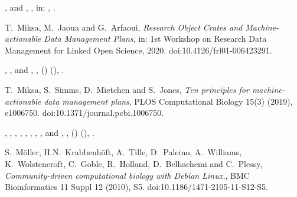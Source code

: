 \documentclass[ds,v1.1.2,openaccess]{iosart2x}%
\begin{document}
\begin{thebibliography}{}
%
\begin{bchapter}
,
 and
,
,
in: ,
.
\end{bchapter}
%
\OrigBibText
T.~Miksa,
M.~Jaoua and
G.~Arfaoui,
\textit{Research Object Crates and Machine-actionable Data Management Plans},
in: 1st Workshop on Research Data Management for Linked Open Science,
2020.
doi:10.4126/frl01-006423291.
\endOrigBibText
{}
\endbibitem

%
\begin{barticle}
,
,
 and
,
,
()
(),
.
\end{barticle}
%
\OrigBibText
T.~Miksa,
S.~Simms,
D.~Mietchen and
S.~Jones,
\textit{Ten principles for machine-actionable data management plans},
{PLOS} Computational Biology
15(3)
(2019),
e1006750.
doi:10.1371/journal.pcbi.1006750.
\endOrigBibText
{}
\endbibitem

%
\begin{barticle}
,
,
,
,
,
,
,
,
 and
,
,
()
(),
.
\end{barticle}
%
\OrigBibText
S.~M\"{o}ller,
H.N.~Krabbenh\"{o}ft,
A.~Tille,
D.~Paleino,
A.~Williams,
K.~Wolstencroft,
C.~Goble,
R.~Holland,
D.~Belhachemi and
C.~Plessy,
\textit{Community-driven computational biology with Debian Linux.},
{BMC} Bioinformatics
11 Suppl 12
(2010),
S5.
doi:10.1186/1471-2105-11-S12-S5.
\endOrigBibText
{}
\endbibitem


\end{thebibliography}
\end{document}
